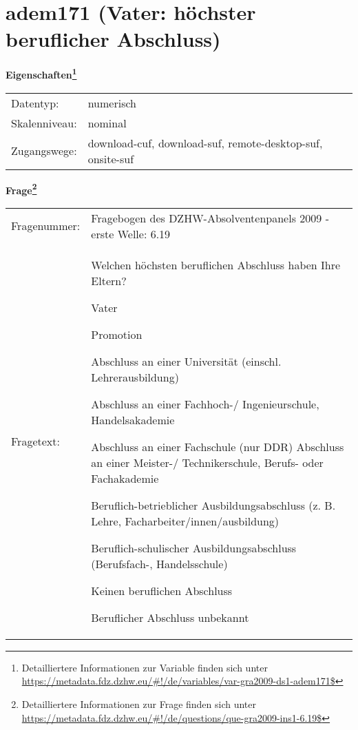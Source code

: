 
    \setcounter{footnote}{0}

    \vspace*{-1.8cm}
	\section{adem171 (Vater: höchster beruflicher Abschluss)}
	\label{section:adem171}



    \vspace*{0.5cm}
    \noindent\textbf{Eigenschaften\footnote{Detailliertere Informationen zur Variable finden sich unter
		\url{https://metadata.fdz.dzhw.eu/\#!/de/variables/var-gra2009-ds1-adem171$}}}\\
	\begin{tabularx}{\hsize}{@{}lX}
	Datentyp: & numerisch \\
	Skalenniveau: & nominal \\
	Zugangswege: &
	  download-cuf, 
	  download-suf, 
	  remote-desktop-suf, 
	  onsite-suf
 \\
    \end{tabularx}



				\vspace*{0.5cm}
                \noindent\textbf{Frage\footnote{Detailliertere Informationen zur Frage finden sich unter
		              \url{https://metadata.fdz.dzhw.eu/\#!/de/questions/que-gra2009-ins1-6.19$}}}\\
				\begin{tabularx}{\hsize}{@{}lX}
					Fragenummer: &
					  Fragebogen des DZHW-Absolventenpanels 2009 - erste Welle:
					  6.19
 \\
					Fragetext: & Welchen höchsten beruflichen Abschluss haben Ihre Eltern?\par  Vater\par  Promotion\par  Abschluss an einer Universität (einschl. Lehrerausbildung)\par  Abschluss an einer Fachhoch-/ Ingenieurschule, Handelsakademie\par  Abschluss an einer Fachschule (nur DDR) Abschluss an einer Meister-/ Technikerschule, Berufs- oder Fachakademie\par  Beruflich-betrieblicher Ausbildungsabschluss (z. B. Lehre, Facharbeiter/innen/ausbildung)\par  Beruflich-schulischer Ausbildungsabschluss (Berufsfach-, Handelsschule)\par  Keinen beruflichen Abschluss\par  Beruflicher Abschluss unbekannt \\
				\end{tabularx}






